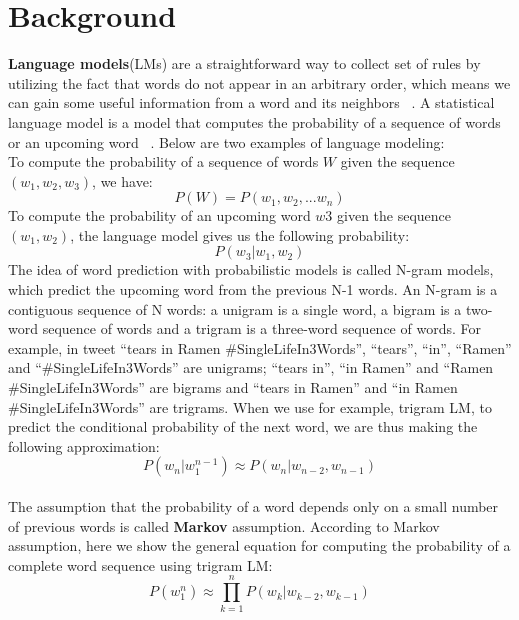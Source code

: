 \documentclass[11pt,a4paper]{article}
\begin{document}
\section{Background}
\textbf{Language models}(LMs) are a straightforward way to collect set of rules by utilizing the fact that words do not appear in an arbitrary order, which means we can gain some useful information from a word and its neighbors ~\cite{JM}. A statistical language model is a model that computes the probability of a sequence of words or an upcoming word ~\cite{JM}. Below are two examples of language modeling:\\
\indent To compute the probability of a sequence of words $W$ given the sequence $(w_{1},w_{2},w_{3})$, we have:
\begin{equation}
P(W) = P(w_{1},w_{2},...w_{n})
\end{equation}
\indent To compute the probability of an upcoming word $w3$ given the sequence $(w_{1},w_{2})$, the language model gives us the following probability:
\begin{equation}
P(w_{3}|w_{1},w_{2})
\end{equation}
\indent The idea of word prediction with probabilistic models is called N-gram models, which predict the upcoming word from the previous N-1 words. An N-gram is a contiguous sequence of N words: a unigram is a single word, a bigram is a two-word sequence of words and a trigram is a three-word sequence of words. For example, in tweet ``tears in Ramen \#SingleLifeIn3Words'', ``tears'', ``in'', ``Ramen'' and ``\#SingleLifeIn3Words'' are unigrams; ``tears in'', ``in Ramen'' and ``Ramen \#SingleLifeIn3Words'' are bigrams and ``tears in Ramen'' and ``in Ramen \#SingleLifeIn3Words'' are trigrams.
\indent  When we use for example, trigram LM, to predict the conditional probability of the next word, we are thus making the following approximation:
\begin{equation}
P(w_n|w_1^{n-1})\approx P(w_n|w_{n-2}, w_{n-1})
\end{equation}\\
\indent The assumption that the probability of a word depends only on a small number of previous words is called \textbf{Markov} assumption. According to Markov assumption, here we show the general equation for computing the probability of a complete word sequence using trigram LM:
\begin{equation}
P(w_1^n)\approx \prod_{k=1}^{n} P(w_k|w_{k-2}, w_{k-1})
\end{equation}\\
\end{document}
